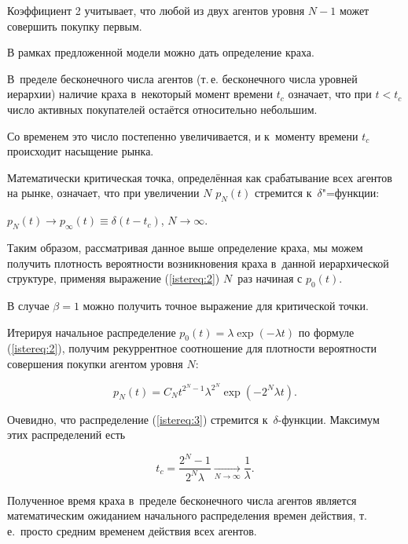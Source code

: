 Коэффициент 2 учитывает, что любой из двух агентов уровня $N-1$ может совершить покупку первым.



В рамках предложенной модели можно дать определение краха.

В~пределе бесконечного числа агентов (т.\,е. бесконечного числа уровней иерархии) наличие краха в~некоторый момент времени $t_c  $ означает, что при $t<t_c  $ число активных покупателей остаётся относительно небольшим.

Со временем это число постепенно увеличивается, и к~моменту времени $t_c$ происходит насыщение рынка.

Математически критическая точка, определённая как срабатывание всех агентов на рынке, означает, что при увеличении $N$ $p_{N}(t)$ стремится к~$\delta $"=функции:

$p_{N} (t)\to p_{\infty } (t) \equiv \delta (t-t_c)$, $N\to \infty $.

Таким образом, рассматривая данное выше определение краха, мы можем получить плотность вероятности возникновения краха в~данной иерархической структуре, применяя выражение (\ref{istereq:2}) $N$~раз начиная с $p_{0} (t)$.



В случае $\beta =1$ можно получить точное выражение для критической точки.

Итерируя начальное распределение $p_{0} (t)=\lambda \exp (-\lambda t)$ по формуле (\ref{istereq:2}), получим рекуррентное соотношение для плотности вероятности совершения покупки агентом уровня $N$:

\begin{equation}

p_{N} (t)=C_{N} t^{2^{N} -1} \lambda ^{2^{N} } \exp (-2^{N} \lambda  t).

\label{istereq:3}

\end{equation}

Очевидно, что распределение (\ref{istereq:3}) стремится к~$\delta $-функции. Максимум этих распределений есть

$$

t_c  =\frac{2^{N} -1}{2^{N} \lambda }  \xrightarrow[{N\to  \infty }]{} \frac{1}{\lambda } .

$$

Полученное время краха в~пределе бесконечного числа агентов является математическим ожиданием начального распределения времен действия, т.\,е.~просто средним временем действия всех агентов.



